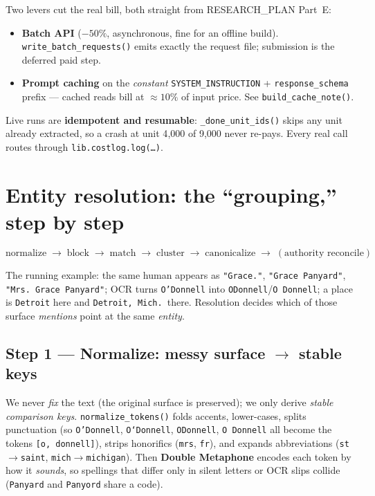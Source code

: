 \documentclass[11pt]{article}
\newcommand{\code}[1]{\texttt{#1}}
\begin{document}
Two levers cut the real bill, both straight from RESEARCH\_PLAN Part~E:
\begin{itemize}[leftmargin=*]
  \item \textbf{Batch API} ($-50\%$, asynchronous, fine for an offline build).
        \code{write\_batch\_requests()} emits exactly the request file; submission
        is the deferred paid step.
  \item \textbf{Prompt caching} on the \emph{constant} \code{SYSTEM\_INSTRUCTION} +
        \code{response\_schema} prefix --- cached reads bill at $\approx 10\%$ of
        input price. See \code{build\_cache\_note()}.
\end{itemize}
Live runs are \textbf{idempotent and resumable}: \code{\_done\_unit\_ids()} skips any
unit already extracted, so a crash at unit 4{,}000 of 9{,}000 never re-pays. Every
real call routes through \code{lib.costlog.log(\dots)}.

\section{Entity resolution: the ``grouping,'' step by step}

\[
\text{normalize} \;\to\; \text{block} \;\to\; \text{match} \;\to\;
\text{cluster} \;\to\; \text{canonicalize} \;\to\; (\text{authority reconcile})
\]

The running example: the same human appears as \texttt{"Grace."},
\texttt{"Grace Panyard"}, \texttt{"Mrs.\ Grace Panyard"}; OCR turns
\texttt{O'Donnell} into \texttt{ODonnell}/\texttt{O Donnell}; a place is
\texttt{Detroit} here and \texttt{Detroit, Mich.}\ there. Resolution decides which
of those surface \emph{mentions} point at the same \emph{entity}.

\subsection{Step 1 --- Normalize: messy surface $\to$ stable keys}

We never \emph{fix} the text (the original surface is preserved); we only derive
\emph{stable comparison keys}. \code{normalize\_tokens()} folds accents,
lower-cases, splits punctuation (so \texttt{O'Donnell}, \texttt{O`Donnell},
\texttt{ODonnell}, \texttt{O Donnell} all become the tokens \texttt{[o, donnell]}),
strips honorifics (\texttt{mrs}, \texttt{fr}), and expands abbreviations
(\texttt{st}$\to$\texttt{saint}, \texttt{mich}$\to$\texttt{michigan}). Then
\textbf{Double Metaphone} encodes each token by how it \emph{sounds}, so spellings
that differ only in silent letters or OCR slips collide (\texttt{Panyard} and
\texttt{Panyord} share a code).
\end{document}
